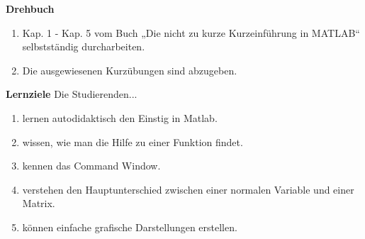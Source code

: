 \textbf{Drehbuch}
\begin{enumerate}
\item Kap. 1 - Kap. 5 vom Buch „Die nicht zu kurze Kurzeinführung in MATLAB“ selbstständig durcharbeiten.
\item Die ausgewiesenen Kurzübungen sind abzugeben.
\end{enumerate}
\textbf{Lernziele}
Die Studierenden...
\begin{enumerate}
\item lernen autodidaktisch den Einstig in Matlab.
\item wissen, wie man die Hilfe zu einer Funktion findet.
\item kennen das Command Window.
\item verstehen den Hauptunterschied zwischen einer normalen Variable und einer Matrix.
\item können einfache grafische Darstellungen erstellen.
\end{enumerate}

